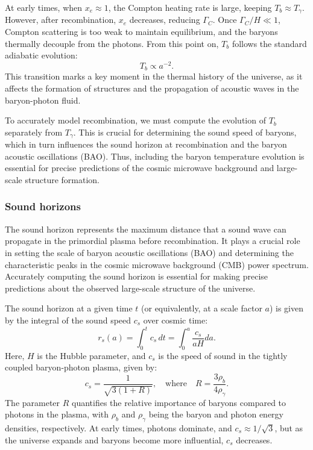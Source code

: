 \documentclass{aa}
\begin{document}
At early times, when $x_e \approx 1$, the Compton heating rate is large, keeping $T_b \approx T_\gamma$. However, after recombination, $x_e$ decreases, reducing $\Gamma_C$. Once $\Gamma_C / H \ll 1$, Compton scattering is too weak to maintain equilibrium, and the baryons thermally decouple from the photons. From this point on, $T_b$ follows the standard adiabatic evolution:
\begin{equation}
T_b \propto a^{-2}.
\end{equation}
This transition marks a key moment in the thermal history of the universe, as it affects the formation of structures and the propagation of acoustic waves in the baryon-photon fluid.

To accurately model recombination, we must compute the evolution of $T_b$ separately from $T_\gamma$. This is crucial for determining the sound speed of baryons, which in turn influences the sound horizon at recombination and the baryon acoustic oscillations (BAO). Thus, including the baryon temperature evolution is essential for precise predictions of the cosmic microwave background and large-scale structure formation.
\color{black}








\subsubsection{Sound horizons}
\color{Plum}
The sound horizon represents the maximum distance that a sound wave can propagate in the primordial plasma before recombination. It plays a crucial role in setting the scale of baryon acoustic oscillations (BAO) and determining the characteristic peaks in the cosmic microwave background (CMB) power spectrum. Accurately computing the sound horizon is essential for making precise predictions about the observed large-scale structure of the universe.

The sound horizon at a given time $t$ (or equivalently, at a scale factor $a$) is given by the integral of the sound speed $c_s$ over cosmic time:
\begin{equation}
r_s(a) = \int_0^t c_s \, dt = \int_0^a \frac{c_s}{aH} da.
\end{equation}
Here, $H$ is the Hubble parameter, and $c_s$ is the speed of sound in the tightly coupled baryon-photon plasma, given by:
\begin{equation}
c_s = \frac{1}{\sqrt{3(1 + R)}}, \quad \text{where} \quad R = \frac{3\rho_b}{4\rho_\gamma}.
\end{equation}
The parameter $R$ quantifies the relative importance of baryons compared to photons in the plasma, with $\rho_b$ and $\rho_\gamma$ being the baryon and photon energy densities, respectively. At early times, photons dominate, and $c_s \approx 1/\sqrt{3}$, but as the universe expands and baryons become more influential, $c_s$ decreases.
\end{document}
